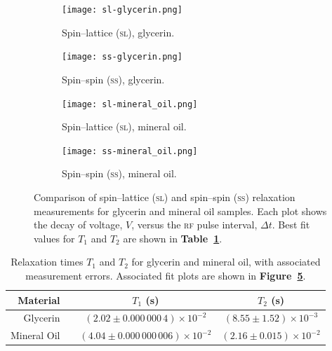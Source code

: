 \documentclass[12pt]{report}
\begin{document}
\begin{figure}[tbh]
    \centering
    \begin{subfigure}{0.45\textwidth}
        \centering
        \texttt{[image: sl-glycerin.png]}
        \caption{Spin–lattice (\textsc{sl}), glycerin.}
        \label{fig:sl-glycerin}
    \end{subfigure}
    \hspace{0.02\textwidth} %
    \begin{subfigure}{0.45\textwidth}
        \centering
        \texttt{[image: ss-glycerin.png]}
        \caption{Spin–spin (\textsc{ss}), glycerin.}
        \label{fig:ss-glycerin}
    \end{subfigure}
    
    \vspace{\baselineskip} %
    
    \begin{subfigure}{0.45\textwidth}
        \centering
        \texttt{[image: sl-mineral\_oil.png]}
        \caption{Spin–lattice (\textsc{sl}), mineral oil.}
        \label{fig:sl-mineral-oil}
    \end{subfigure}
    \hspace{0.02\textwidth} %
    \begin{subfigure}{0.45\textwidth}
        \centering
        \texttt{[image: ss-mineral\_oil.png]}
        \caption{Spin–spin (\textsc{ss}), mineral oil.}
        \label{fig:ss-mineral-oil}
    \end{subfigure}
    
    \caption{Comparison of spin–lattice (\textsc{sl}) and spin–spin (\textsc{ss}) relaxation measurements for glycerin and mineral oil samples. Each plot shows the decay of voltage, $V$, versus the \textsc{rf} pulse interval, $\Delta t$. Best fit values for $T_1$ and $T_2$ are shown in \textbf{Table~\ref{tab:relaxation-times}}.}
    \label{fig:fit-plots}
\end{figure}

\begin{table}[tbh]
    \centering
    \begin{tabular}{rccc}
         \textbf{Material}   && $T_1$ (s) & $T_2$ (s) \\ \hline
        Glycerin    && $(2.02 \pm 0.000\,000\,4) \times 10^{-2}$ & $(8.55 \pm 1.52) \times 10^{-3}$ \\
        Mineral Oil && $(4.04 \pm 0.000\,000\,006) \times 10^{-2}$ & $(2.16 \pm 0.015) \times 10^{-2}$ \\
    \end{tabular}
    \caption{Relaxation times $T_1$ and $T_2$ for glycerin and mineral oil, with associated measurement errors. Associated fit plots are shown in \textbf{Figure~\ref{fig:fit-plots}}.}
    \label{tab:relaxation-times}
\end{table}
\end{document}
